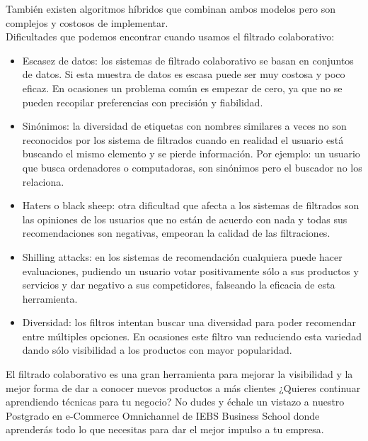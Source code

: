 \documentclass[preprint,12pt]{elsarticle}
\begin{document}
\begin{enumerate}[5.1]
También existen algoritmos híbridos que combinan ambos modelos pero son complejos y costosos de implementar.\\
Dificultades que podemos encontrar cuando usamos el filtrado colaborativo:\\
	\begin{itemize}
	\item Escasez de datos: los sistemas de filtrado colaborativo se basan en conjuntos de datos. Si esta muestra de datos es escasa puede ser muy costosa y poco eficaz. En ocasiones un problema común es empezar de cero, ya que no se pueden recopilar preferencias con precisión y fiabilidad.
	\item Sinónimos: la diversidad de etiquetas con nombres similares a veces no son reconocidos por los sistema de filtrados cuando en realidad el usuario está buscando el mismo elemento y se pierde información. Por ejemplo: un usuario que busca ordenadores o computadoras, son sinónimos pero el buscador no los relaciona.
	\item Haters o black sheep: otra dificultad que afecta a los sistemas de filtrados son las opiniones de los usuarios que no están de acuerdo con nada y todas sus recomendaciones son negativas, empeoran la calidad de las filtraciones. 
	\item Shilling attacks: en los sistemas de recomendación cualquiera puede hacer evaluaciones, pudiendo un usuario votar positivamente sólo a sus productos y servicios y dar negativo a sus competidores, falseando la eficacia de esta herramienta. 
	\item Diversidad: los filtros intentan buscar una diversidad para poder recomendar entre múltiples opciones. En ocasiones este filtro van reduciendo esta variedad dando sólo visibilidad a los productos con mayor popularidad.\\
	\end{itemize}

El filtrado colaborativo es una gran herramienta para mejorar la visibilidad y la mejor forma de dar a conocer nuevos productos a más clientes ¿Quieres continuar aprendiendo técnicas para tu negocio? No dudes y échale un vistazo a nuestro Postgrado en e-Commerce Omnichannel de IEBS Business School donde aprenderás todo lo que necesitas para dar el mejor impulso a tu empresa.		

\end{enumerate}
\end{document}
